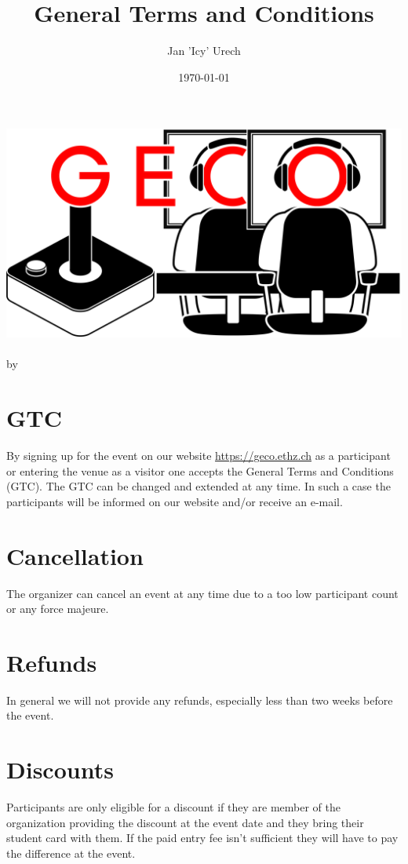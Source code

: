 \documentclass{article}
\title{General Terms and Conditions}
\author{Jan 'Icy' Urech}
\date{\today}
\begin{document}
\makeatletter
\begin{titlepage}
\centering
\includegraphics[scale=0.075]{img/GECo.png}\\
\LARGE \@title\\ \normalsize by \@author\\ \@date
\end{titlepage}
\makeatother


\clearpage

\tableofcontents
\clearpage


\section{GTC}
By signing up for the event on our website \url{https://geco.ethz.ch} as a participant or entering the venue as a visitor one accepts the General Terms and Conditions (GTC).
The GTC can be changed and extended at any time. In such a case the participants will be informed on our website and/or receive an e-mail.


\section{Cancellation}
The organizer can cancel an event at any time due to a too low participant count or any force majeure.

\section{Refunds}
In general we will not provide any refunds, especially less than two weeks before the event.

\section{Discounts}
Participants are only eligible for a discount if they are member of the organization providing the discount at the event date and they bring their student card with them. If the paid entry fee isn't sufficient they will have to pay the difference at the event.
\end{document}
